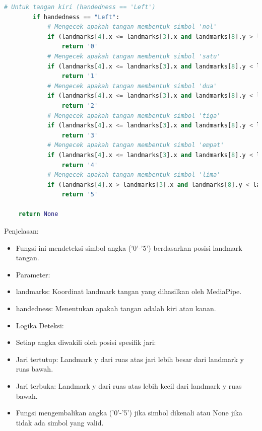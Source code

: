 \documentclass[11pt,a4paper]{article}
\begin{document}
\begin{lstlisting}[language=Python, caption=Fungsi Mendeteksi Landmark Tangan]
        # Untuk tangan kiri (handedness == 'Left')
        if handedness == "Left":
            # Mengecek apakah tangan membentuk simbol 'nol'
            if (landmarks[4].x <= landmarks[3].x and landmarks[8].y > landmarks[6].y and landmarks[12].y > landmarks[10].y and landmarks[16].y > landmarks[14].y and landmarks[20].y > landmarks[18].y):
                return '0'
            # Mengecek apakah tangan membentuk simbol 'satu'
            if (landmarks[4].x <= landmarks[3].x and landmarks[8].y < landmarks[6].y and landmarks[12].y > landmarks[10].y and landmarks[16].y > landmarks[14].y and landmarks[20].y > landmarks[18].y):
                return '1'
            # Mengecek apakah tangan membentuk simbol 'dua'
            if (landmarks[4].x <= landmarks[3].x and landmarks[8].y < landmarks[6].y and landmarks[12].y < landmarks[10].y and landmarks[16].y > landmarks[14].y and landmarks[20].y > landmarks[18].y):
                return '2'
            # Mengecek apakah tangan membentuk simbol 'tiga'
            if (landmarks[4].x <= landmarks[3].x and landmarks[8].y < landmarks[6].y and landmarks[12].y < landmarks[10].y and landmarks[16].y < landmarks[14].y and landmarks[20].y > landmarks[18].y):
                return '3'
            # Mengecek apakah tangan membentuk simbol 'empat'
            if (landmarks[4].x <= landmarks[3].x and landmarks[8].y < landmarks[6].y and landmarks[12].y < landmarks[10].y and landmarks[16].y < landmarks[14].y and landmarks[20].y < landmarks[18].y):
                return '4'
            # Mengecek apakah tangan membentuk simbol 'lima'
            if (landmarks[4].x > landmarks[3].x and landmarks[8].y < landmarks[6].y and landmarks[12].y < landmarks[10].y and landmarks[16].y < landmarks[14].y and landmarks[20].y < landmarks[18].y):
                return '5'
        
    return None
    \end{lstlisting}
    Penjelasan:
    \begin{itemize}
    \item Fungsi ini mendeteksi simbol angka ('0'-'5') berdasarkan posisi landmark tangan.
    \item Parameter:
        \item landmarks: Koordinat landmark tangan yang dihasilkan oleh MediaPipe.
        \item handedness: Menentukan apakah tangan adalah kiri atau kanan.
    \item Logika Deteksi:
        \item  Setiap angka diwakili oleh posisi spesifik jari:
            \item Jari tertutup: Landmark y dari ruas atas jari lebih besar dari landmark y ruas bawah.
            \item Jari terbuka: Landmark y dari ruas atas lebih kecil dari landmark y ruas bawah.
    \item Fungsi mengembalikan angka ('0'-'5') jika simbol dikenali atau None jika tidak ada simbol yang valid.
    \end{itemize}
\end{document}
